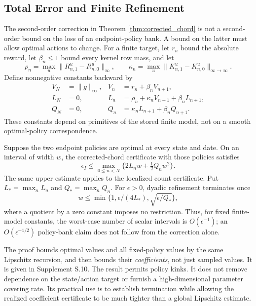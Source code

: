 \subsection{Total Error and Finite Refinement}
\label{sec:r7_total_error}
The second-order correction in Theorem \ref{thm:corrected_chord} is not a second-order bound on the loss of an endpoint-policy bank. A bound on the latter must allow optimal actions to change. For a finite target, let $r_n$ bound the absolute reward, let $\beta_n\leq1$ bound every kernel row mass, and let
\[
 \rho_n=\max_u\|R^u_{n,1}-R^u_{n,0}\|_\infty,
 \qquad \kappa_n=\max_u\|K^u_{n,1}-K^u_{n,0}\|_{\infty\to\infty}.
\]
Define nonnegative constants backward by
\begin{align}
 V_N&=\|g\|_\infty,& V_n&=r_n+\beta_nV_{n+1},\nonumber\\
 L_N&=0,&L_n&=\rho_n+\kappa_nV_{n+1}+\beta_nL_{n+1},\label{eq:r7_constants}\\
 Q_N&=0,&Q_n&=\kappa_nL_{n+1}+\beta_nQ_{n+1}.\nonumber
\end{align}
These constants depend on primitives of the stored finite model, not on a smooth optimal-policy correspondence.

\begin{theorem}
\label{thm:r7_total_error}
Suppose the two endpoint policies are optimal at every state and date. On an interval of width $w$, the corrected-chord certificate with those policies satisfies
\begin{equation}
 \epsilon_I\leq\max_{0\leq n<N}\{2L_nw+\tfrac12Q_nw^2\}.
 \label{eq:r7_total_bound}
\end{equation}
The same upper estimate applies to the localized count certificate. Put $L_* =\max_nL_n$ and $Q_* =\max_nQ_n$. For $\epsilon>0$, dyadic refinement terminates once
\[
 w\leq\min\{1,\epsilon/(4L_*),\sqrt{\epsilon/Q_*}\},
\]
where a quotient by a zero constant imposes no restriction. Thus, for fixed finite-model constants, the worst-case number of scalar intervals is $O(\epsilon^{-1})$; an $O(\epsilon^{-1/2})$ policy-bank claim does not follow from the correction alone.
\end{theorem}

The proof bounds optimal values and all fixed-policy values by the same Lipschitz recursion, and then bounds their \emph{coefficients}, not just sampled values. It is given in Supplement S.10. The result permits policy kinks. It does not remove dependence on the state/action target or furnish a high-dimensional parameter covering rate. Its practical use is to establish termination while allowing the realized coefficient certificate to be much tighter than a global Lipschitz estimate.

